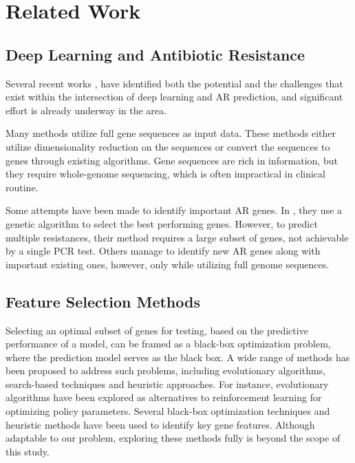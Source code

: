 \section{Related Work}
\subsection{Deep Learning and Antibiotic Resistance}

Several recent works \cite{chakraborty_deep_2022,kim_machine_2022, ren_prediction_2022}, have identified both the potential and the challenges that exist within the intersection of deep learning and AR prediction, and significant effort is already underway in the area. 

Many methods \cite{tharmakulasingam_explainable_2022, tharmakulasingam_rectified_2023, macesic_predicting_2020, jin_predicting_2024, kuang_accurate_2022} utilize full gene sequences as input data. These methods either utilize dimensionality reduction on the sequences or convert the sequences to genes through existing algorithms. Gene sequences are rich in information, but they require whole-genome sequencing, which is often impractical in clinical routine.

Some attempts \cite{her_pan-genome-based_2018, hyun_machine_2020, kavvas_machine_2018} have been made to identify important AR genes. In  \cite{her_pan-genome-based_2018}, they use a genetic algorithm to select the best performing genes. However, to predict multiple resistances, their method requires a large subset of genes, not achievable by a single PCR test. Others \cite{hyun_machine_2020, kavvas_machine_2018} manage to identify new AR genes along with important existing ones, however, only while utilizing full genome sequences.

\subsection{Feature Selection Methods}

Selecting an optimal subset of genes for testing, based on the predictive performance of a model, can be framed as a black-box optimization problem, where the prediction model serves as the black box. A wide range \cite{sxue_survey_evolutionary_2016} of methods has been proposed to address such problems, including evolutionary algorithms, search-based techniques and heuristic approaches. For instance, evolutionary algorithms have been explored \cite{salimans2017evolutionstrategiesscalablealternative} as alternatives to reinforcement learning for optimizing policy parameters. Several black-box optimization techniques \cite{pudjihartono_review_feature_selection_2022} and heuristic methods \cite{ALIREZANEJAD20201173} have been used to identify key gene features. Although adaptable to our problem, exploring these methods fully is beyond the scope of this study.



